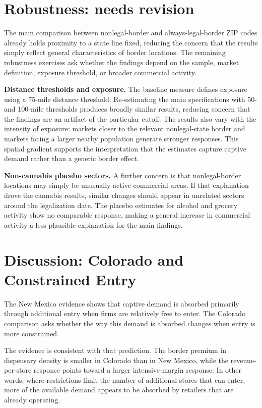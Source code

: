\documentclass[english,12pt]{article}
\begin{document}
\FloatBarrier

\section{Robustness: needs revision}
\label{sec:falsification}

The main comparison between nonlegal-border and always-legal-border ZIP codes already holds proximity to a state line fixed, reducing the concern that the results simply reflect general characteristics of border locations. The remaining robustness exercises ask whether the findings depend on the sample, market definition, exposure threshold, or broader commercial activity.


\textbf{Distance thresholds and exposure.} The baseline measure defines exposure using a 75-mile distance threshold. Re-estimating the main specifications with 50- and 100-mile thresholds produces broadly similar results, reducing concern that the findings are an artifact of the particular cutoff. The results also vary with the intensity of exposure: markets closer to the relevant nonlegal-state border and markets facing a larger nearby population generate stronger responses. This spatial gradient supports the interpretation that the estimates capture captive demand rather than a generic border effect.

\textbf{Non-cannabis placebo sectors.} A further concern is that nonlegal-border locations may simply be unusually active commercial areas. If that explanation drove the cannabis results, similar changes should appear in unrelated sectors around the legalization date. The placebo estimates for alcohol and grocery activity show no comparable response, making a general increase in commercial activity a less plausible explanation for the main findings.

\FloatBarrier

\section{Discussion: Colorado and Constrained Entry}
\label{sec:discussion}

The New Mexico evidence shows that captive demand is absorbed primarily through additional entry when firms are relatively free to enter. The Colorado comparison asks whether the way this demand is absorbed changes when entry is more constrained.

The evidence is consistent with that prediction. The border premium in dispensary density is smaller in Colorado than in New Mexico, while the revenue-per-store response points toward a larger intensive-margin response. In other words, where restrictions limit the number of additional stores that can enter, more of the available demand appears to be absorbed by retailers that are already operating.
\end{document}
